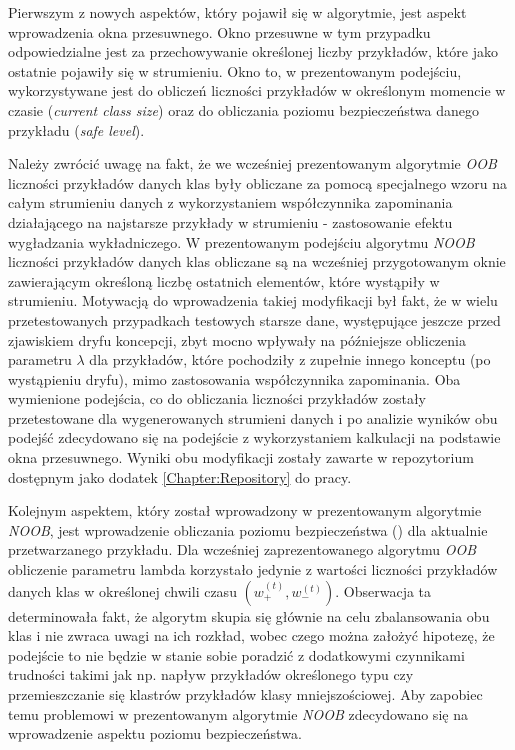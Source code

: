 \noindent Pierwszym z nowych aspektów, który pojawił się w algorytmie, jest aspekt wprowadzenia okna przesuwnego. Okno przesuwne w tym przypadku odpowiedzialne jest za przechowywanie określonej liczby przykładów, które jako ostatnie pojawiły się w strumieniu. Okno to, w prezentowanym podejściu, wykorzystywane jest do obliczeń liczności przykładów w określonym momencie w czasie (\textit{current class size}) oraz do obliczania poziomu bezpieczeństwa danego przykładu (\textit{safe level}).

Należy zwrócić uwagę na fakt, że we wcześniej prezentowanym algorytmie \textit{OOB} liczności przykładów danych klas były obliczane za pomocą specjalnego wzoru na całym strumieniu danych z wykorzystaniem współczynnika zapominania działającego na najstarsze przykłady w strumieniu - zastosowanie efektu wygładzania wykładniczego. W prezentowanym podejściu algorytmu \textit{NOOB} liczności przykładów danych klas obliczane są na wcześniej przygotowanym oknie zawierającym określoną liczbę ostatnich elementów, które wystąpiły w strumieniu. Motywacją do wprowadzenia takiej modyfikacji był fakt, że w wielu przetestowanych przypadkach testowych starsze dane, występujące jeszcze przed zjawiskiem dryfu koncepcji, zbyt mocno wpływały na późniejsze obliczenia parametru $\lambda$ dla przykładów, które pochodziły z zupełnie innego konceptu (po wystąpieniu dryfu), mimo zastosowania współczynnika zapominania. Oba wymienione podejścia, co do obliczania liczności przykładów zostały przetestowane dla wygenerowanych strumieni danych i po analizie wyników obu podejść zdecydowano się na podejście z wykorzystaniem kalkulacji na podstawie okna przesuwnego. Wyniki obu modyfikacji zostały zawarte w repozytorium dostępnym jako dodatek \ref{Chapter:Repository} do pracy.

Kolejnym aspektem, który został wprowadzony w prezentowanym algorytmie \textit{NOOB}, jest wprowadzenie obliczania poziomu bezpieczeństwa () dla aktualnie przetwarzanego przykładu. Dla wcześniej zaprezentowanego algorytmu \textit{OOB} obliczenie parametru lambda korzystało jedynie z wartości liczności przykładów danych klas w określonej chwili czasu $(w^{(t)}_{+}, w^{(t)}_{-})$. Obserwacja ta determinowała fakt, że algorytm skupia się głównie na celu zbalansowania obu klas i nie zwraca uwagi na ich rozkład, wobec czego można założyć hipotezę, że podejście to nie będzie w stanie sobie poradzić z dodatkowymi czynnikami trudności takimi jak np. napływ przykładów określonego typu czy przemieszczanie się klastrów przykładów klasy mniejszościowej. Aby zapobiec temu problemowi w prezentowanym algorytmie \textit{NOOB} zdecydowano się na wprowadzenie aspektu poziomu bezpieczeństwa.

